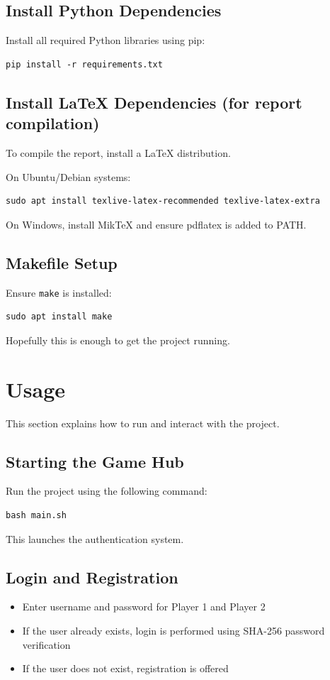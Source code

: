 \documentclass[12pt,a4paper]{article}
\begin{document}
\subsection{Install Python Dependencies}
Install all required Python libraries using pip:

\begin{verbatim}
pip install -r requirements.txt
\end{verbatim}

\subsection{Install LaTeX Dependencies (for report compilation)}
To compile the report, install a LaTeX distribution.

On Ubuntu/Debian systems:
\begin{verbatim}
sudo apt install texlive-latex-recommended texlive-latex-extra
\end{verbatim}

On Windows, install MikTeX and ensure pdflatex is added to PATH.

\subsection{Makefile Setup}
Ensure \texttt{make} is installed:

\begin{verbatim}
sudo apt install make
\end{verbatim}

Hopefully this is enough to get the project running.

\section{Usage}

This section explains how to run and interact with the project.

\subsection{Starting the Game Hub}
Run the project using the following command:

\begin{verbatim}
bash main.sh
\end{verbatim}

This launches the authentication system.

\subsection{Login and Registration}
\begin{itemize}
    \item Enter username and password for Player 1 and Player 2
    \item If the user already exists, login is performed using SHA-256 password verification
    \item If the user does not exist, registration is offered
\end{itemize}
\end{document}
